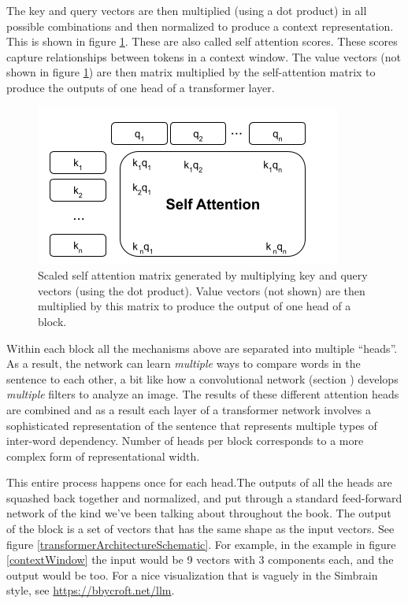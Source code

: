 The key and query vectors are then multiplied (using a dot product) in all possible combinations and then normalized to produce a context representation. This is shown in figure \ref{selfAttention}. These are also called self attention scores. These scores capture relationships between tokens in a context window.  The value vectors (not shown in figure \ref{selfAttention}) are then matrix multiplied by the self-attention matrix to produce the outputs of one head of a transformer layer.

\begin{figure}[h]
\centering
\includegraphics[scale=.6]{./images/selfAttention.png}
\caption[Jeff Yoshimi with consultation from Tim Meyer.]{Scaled self attention matrix generated by multiplying key and query vectors (using the dot product). Value vectors (not shown) are then multiplied by this matrix to produce the output of one head of a block.}
\label{selfAttention}
\end{figure}

Within each block all the mechanisms above are separated into multiple ``heads''. As a result, the network can learn \emph{multiple} ways to compare words in the sentence to each other, a bit like how a convolutional network (section ) develops \emph{multiple} filters to analyze an image. The results of these different attention heads are combined and as a result each layer of a transformer network involves a sophisticated representation of the sentence that represents multiple types of inter-word dependency. Number of heads per block corresponds to a more complex form of representational width.

This entire process happens once for each head.The outputs of all the heads are squashed back together and normalized, and put through a standard feed-forward network of the kind we've been talking about throughout the book. The output of the block is a set of vectors that has the same shape as the input vectors. See figure \ref{transformerArchitectureSchematic}.  For example, in the example in figure \ref{contextWindow} the input would be 9 vectors with 3 components each, and the output would be too. For a nice visualization that is vaguely in the Simbrain style, see \url{https://bbycroft.net/llm}.

